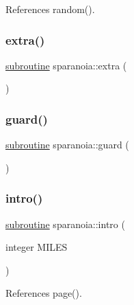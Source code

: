 References random().

\mbox{\label{sparanoia_8f90_a420c65f09dabcda4b79dd31b732a3289}} 
\subsubsection{\texorpdfstring{extra()}{extra()}}
{\footnotesize\ttfamily \hyperlink{M__stopwatch_83_8txt_acfbcff50169d691ff02d4a123ed70482}{subroutine} sparanoia\+::extra (\begin{DoxyParamCaption}{ }\end{DoxyParamCaption})}

\mbox{\label{sparanoia_8f90_a870fdab923b08ed2d23d8f8da26c75ad}} 
\subsubsection{\texorpdfstring{guard()}{guard()}}
{\footnotesize\ttfamily \hyperlink{M__stopwatch_83_8txt_acfbcff50169d691ff02d4a123ed70482}{subroutine} sparanoia\+::guard (\begin{DoxyParamCaption}{ }\end{DoxyParamCaption})}

\mbox{\label{sparanoia_8f90_a08fb2993ab64ff8eadc9bbcdee178dfa}} 
\subsubsection{\texorpdfstring{intro()}{intro()}}
{\footnotesize\ttfamily \hyperlink{M__stopwatch_83_8txt_acfbcff50169d691ff02d4a123ed70482}{subroutine} sparanoia\+::intro (\begin{DoxyParamCaption}\item[{integer}]{M\+I\+L\+ES }\end{DoxyParamCaption})}



References page().

\mbox{\label{sparanoia_8f90_ae605cf6771f748638a7ec12933f8ad86}} 
